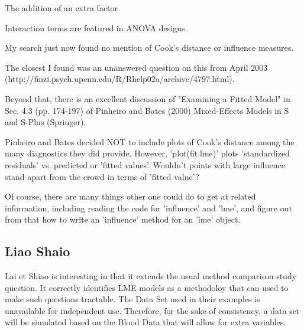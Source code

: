 \documentclass[12pt, a4paper]{report}
\begin{document}
The addition of an extra factor

Interaction terms are featured in ANOVA designs.

My search just now found no mention of Cook's distance or influence measures.  

The closest I found was an unanswered question on this from 
April 2003 (http://finzi.psych.upenn.edu/R/Rhelp02a/archive/4797.html).

Beyond that, there is an excellent discussion of "Examining a Fitted Model" in Sec. 4.3 (pp. 174-197) of Pinheiro and Bates (2000) 
Mixed-Effects Models in S and S-Plus (Springer).  

Pinheiro and Bates decided NOT to include plots of Cook's distance among the many diagnostics they did provide.  
However, 'plot(fit.lme)' plots 'standardized residuals' vs. predicted or 'fitted values'.  
Wouldn't points with large influence stand apart from the crowd in terms of 'fitted value'?

Of course, there are many things other one could do to get at related information, including reading the code for 'influence' and 'lme', and 
figure out from that how to write an 'influence' method for an 'lme' object. 


\subsection{ Liao Shaio}

Lai et Shiao is interesting in that it extends the usual method comparison study question. It correctly identifies LME models as a methodoloy that can used to make such questions tractable.
The Data Set used in their examples is unavailable for independent use. Therefore, for the sake of consistency, a data set will be simulated based on the Blood Data that will allow for extra variables.





\end{document}
